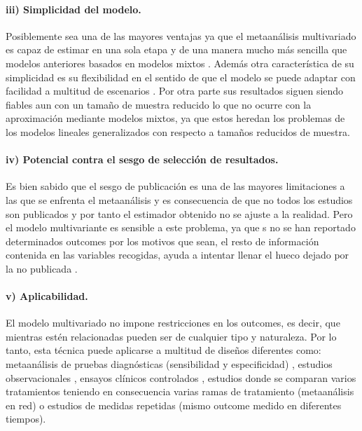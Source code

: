 \documentclass[a4paper,openright,12pt]{report}
\begin{document}
\paragraph{iii) Simplicidad del modelo.} Posiblemente sea una de las mayores ventajas ya que el metaanálisis multivariado es capaz de estimar en una sola etapa \cite{Jackson2011} y de una manera mucho más sencilla que modelos anteriores basados en modelos mixtos \cite{Berkey1996}\cite{Berkey1998}. Además otra característica de su simplicidad es su flexibilidad en el sentido de que el modelo se puede adaptar con facilidad a multitud de escenarios \cite{Nam2003}. Por otra parte sus resultados siguen siendo fiables aun con un tamaño de muestra reducido \cite{Nam2003} lo que no ocurre con la aproximación mediante modelos mixtos, ya que estos heredan los problemas de los modelos lineales generalizados con respecto a tamaños reducidos de muestra.
\paragraph{iv) Potencial contra el sesgo de selección de resultados.} Es bien sabido que el sesgo de publicación es una de las mayores limitaciones a las que se enfrenta el metaanálisis y es consecuencia de que no todos los estudios son publicados y por tanto el estimador obtenido no se ajuste a la realidad. Pero el modelo multivariante es sensible a este problema, ya que s no se han reportado determinados outcomes por los motivos que sean, el resto de información contenida en las variables recogidas, ayuda a intentar llenar el hueco dejado por la no publicada \cite{Riley2007}.
\paragraph{v) Aplicabilidad.} El modelo multivariado no impone restricciones en los outcomes, es decir, que mientras estén relacionadas pueden ser de cualquier tipo y naturaleza. Por lo tanto, esta técnica puede aplicarse a multitud de diseños diferentes como: metaanálisis de pruebas diagnósticas (sensibilidad y especificidad) \cite{Jackson2011}, estudios observacionales \cite{Jackson2011}, ensayos clínicos controlados \cite{Jackson2011}\cite{Nam2003}, estudios donde se comparan varios tratamientos teniendo en consecuencia varias ramas de tratamiento (metaanálisis en red) \cite{Jackson2011}\cite{Nam2003} o estudios de medidas repetidas (mismo outcome medido en diferentes tiempos).
\newpage
\end{document}
